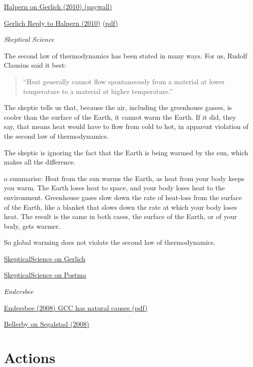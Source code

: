 \documentclass[
]{book}
\begin{document}
\href{https://ui.adsabs.harvard.edu/abs/2010IJMPB..24.1309H/abstract}{Halpern on Gerlich (2010) (paywall)}

\href{https://arxiv.org/abs/1012.0421}{Gerlich Reply to Halpern (2010)}
\href{pdf/Gerlich_2007_Falsification_Greenhouse_reply_to_Halpern.pdf}{(pdf)}

\emph{Skeptical Science}

The second law of thermodynamics has been stated in many ways. For us, Rudolf Clausius said it best:

\begin{quote}
``Heat generally cannot flow spontaneously from a material at lower temperature to a material at higher temperature.''
\end{quote}

The skeptic tells us that, because the air, including the greenhouse gasses, is cooler than the surface of the Earth, it cannot warm the Earth. If it did, they say, that means heat would have to flow from cold to hot, in apparent violation of the second law of thermodynamics.

The skeptic is ignoring the fact that the Earth is being warmed by the sun, which makes all the difference.

o summarise: Heat from the sun warms the Earth, as heat from your body keeps you warm. The Earth loses heat to space, and your body loses heat to the environment. Greenhouse gases slow down the rate of heat-loss from the surface of the Earth, like a blanket that slows down the rate at which your body loses heat. The result is the same in both cases, the surface of the Earth, or of your body, gets warmer.

So global warming does not violate the second law of thermodynamics.

\href{https://skepticalscience.com/Second-law-of-thermodynamics-greenhouse-theory.htm}{SkepticalScience on Gerlich}

\href{https://skepticalscience.com/postma-disproved-the-greenhouse-effect.htm}{SkepticalScience on Postma}

\emph{Endersbee}

\href{pdf/Endersbee_2008_GCC_has_natural_causes.pdf}{Endersbee (2008) GCC has natural causes (pdf)}

\href{https://forskning.no/klima-kronikk/kronikk-co2-okningen-er-ikke-naturlig/1183609}{Bellerby on Segalstad (2008)}

\hypertarget{part-actions}{%
\part{Actions}\label{part-actions}}
\end{document}
